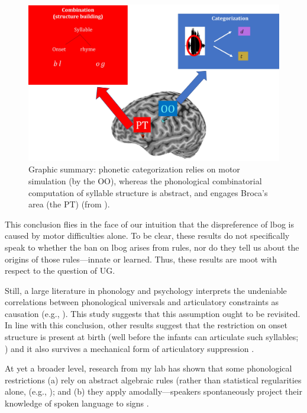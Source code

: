 \documentclass[output=paper,colorlinks,citecolor=brown
]{langscibook}
\begin{document}
\begin{figure}
    \centering
    \includegraphics[width=\textwidth,keepaspectratio]{figures/berent_figure5.jpg}
    \caption{Graphic summary: phonetic categorization relies on motor simulation (by the OO), whereas the phonological combinatorial computation of syllable structure is abstract, and engages Broca’s area (the PT) (from \cite{berent2023phonetic}). }
    \label{fig:figure5}
\end{figure}

This conclusion flies in the face of our intuition that the dispreference of lbog is caused by motor difficulties alone. To be clear, these results do not specifically speak to whether the ban on lbog arises from rules, nor do they tell us about the origins of those rules—innate or learned. Thus, these results are moot with respect to the question of UG. 

Still, a large literature in phonology and psychology interprets the undeniable correlations between phonological universals and articulatory constraints as causation (e.g., \cite{hayes2004phonetically}). This study suggests that this assumption ought to be revisited. In line with this conclusion, other results suggest that the restriction on onset structure is present at birth (well before the infants can articulate such syllables; \cite{gomez2014language}) and it also survives a mechanical form of articulatory suppression \citep{berent2022phonology}. 

At yet a broader level, research from my lab has shown that some phonological restrictions (a) rely on abstract algebraic rules (rather than statistical regularities alone, (e.g., \cite{berent2002scope,gervain2012binding}); and (b) they apply amodally—speakers spontaneously project their knowledge of spoken language to signs \citep{berent2021amodal,berent2016double,berent2020knowledge,berent2021infants,berent2023phonetic}. 
\end{document}
